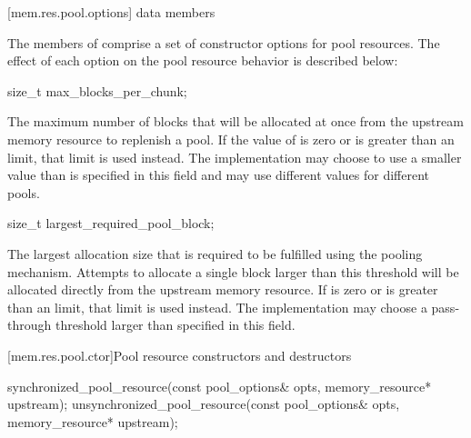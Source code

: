 [mem.res.pool.options]{ data members}

\pnum
The members of 
comprise a set of constructor options for pool resources.
The effect of each option on the pool resource behavior is described below:

%
\begin{itemdecl}
size_t max_blocks_per_chunk;
\end{itemdecl}

\begin{itemdescr}
\pnum
The maximum number of blocks that will be allocated at once
from the upstream memory resource
to replenish a pool.
If the value of  is zero or
is greater than an 
limit, that limit is used instead.
The implementation
may choose to use a smaller value than is specified in this field and
may use different values for different pools.
\end{itemdescr}

%
\begin{itemdecl}
size_t largest_required_pool_block;
\end{itemdecl}

\begin{itemdescr}
\pnum
The largest allocation size that is required to be fulfilled
using the pooling mechanism.
Attempts to allocate a single block larger than this threshold
will be allocated directly from the upstream memory resource.
If  is zero or
is greater than an 
limit, that limit is used instead.
The implementation may choose a pass-through threshold
larger than specified in this field.
\end{itemdescr}

[mem.res.pool.ctor]{Pool resource constructors and destructors}

%
%
\begin{itemdecl}
synchronized_pool_resource(const pool_options& opts, memory_resource* upstream);
unsynchronized_pool_resource(const pool_options& opts, memory_resource* upstream);
\end{itemdecl}

